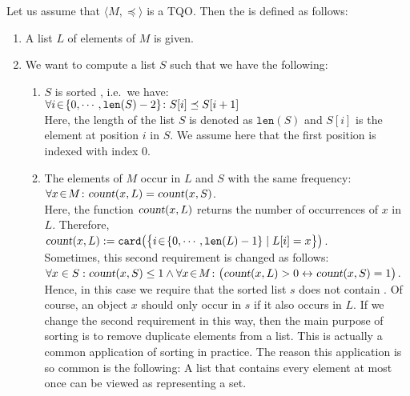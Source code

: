 Let us assume that $\langle M, \preceq \rangle$ is a  \textsc{TQO}.
Then the  is defined as follows:
\begin{enumerate}
\item A list $L$ of elements of $M$ is given.
\item We want to compute a list $S$ such that we have the following: 
  \begin{enumerate}
  \item $S$ is sorted , i.e.~we have: \\[0.2cm]
        \hspace*{1.3cm} 
        $\forall i \!\in\! \{ 0, \cdots, \texttt{len}(S)-2 \} \colon S[i] \preceq S[i+1]$ 
        \\[0.2cm]
        Here, the length of the list $S$ is denoted as $\texttt{len}(S)$ and $S[i]$ is the element at position
        $i$ in $S$.  We assume here that the first position is indexed with index $0$.
  \item The elements of $M$ occur in $L$ and $S$ with the same frequency: \\[0.2cm]
        \hspace*{1.3cm} 
        $\forall x\!\in\! M \colon \textsl{count}(x,L) = \textsl{count}(x,S)$.
        \\[0.2cm]
        Here, the function $\textsl{count}(x,L)$ returns the number of occurrences of $x$ in $L$.
        Therefore,  \\[0.2cm]
        \hspace*{1.3cm}
        $\textsl{count}(x,L) := \texttt{card}\bigl(\bigl\{ i \!\in\! \{0,\cdots,\texttt{len}(L)-1\} \mid L[i] = x \bigr\}\bigr)$.
        \\[0.2cm]
        Sometimes, this second requirement is changed as follows:
        \\[0.2cm]
        \hspace*{1.3cm}
        $\forall x \in S: \textsl{count}(x,S) \leq 1 \wedge \forall x\!\in\! M \colon \bigl(\textsl{count}(x,L) > 0 \leftrightarrow \textsl{count}(x,S) = 1\bigr)$.
        \\[0.2cm]
        Hence, in this case we require that the sorted list $s$ does not contain
        .
        Of course, an object $x$ should only occur in $s$ if it also occurs in $L$.  If we change
        the second requirement in this way, then the main purpose of sorting is to remove duplicate
        elements from a list.  This is actually a common application of sorting in practice.  The
        reason this application is so common is the following: A list that contains every element at
        most once can be viewed as representing a set.
  \end{enumerate}
\end{enumerate}

